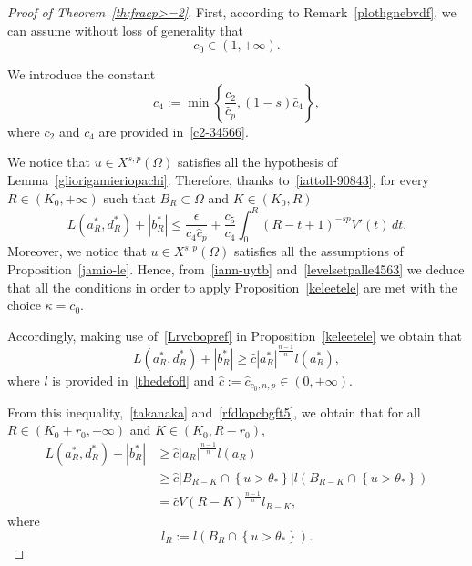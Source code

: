 \documentclass[12pt]{article}
\numberwithin{equation}{section}
\renewcommand{\leq}{\leqslant}
\renewcommand{\geq}{\geqslant}
\begin{document}
\begin{proof}[Proof of Theorem~\ref{th:fracp>=2}]
First, according to Remark~\ref{plothgnebvdf}, we can assume without loss of generality that 
\begin{equation*}
c_0\in (1,+\infty).
\end{equation*}

We introduce the constant
\begin{equation}\label{c5-0987ujgbt}
c_4:=\min \left\lbrace \frac{c_2}{\hat{c}_p}, (1-s)\bar{c}_4\right\rbrace,
\end{equation}
where $c_2$ and $\bar{c}_4$ are provided in~\eqref{c2-34566}. 

We notice that $u\in X^{s,p}(\Omega)$ satisfies all the hypothesis of Lemma~\ref{gliorigamieriopachi}. Therefore, thanks to~\eqref{iattoll-90843}, for every $R\in \left(K_0,+\infty\right)$ such that $B_R\subset\Omega$ and $K\in (K_0,R)$  
\begin{equation}\label{cdm:D}
L(a_R^*,d_R^*)+\left|b_R^*\right|\leq \frac{\epsilon}{c_4\hat{c}_p}+\frac{c_5}{c_4}\int_{0}^R(R-t+1)^{-sp}V'(t)\,dt.
\end{equation}
Moreover, we notice that $u\in X^{s,p}(\Omega)$ satisfies all the assumptions of Proposition~\ref{jamio-le}.  Hence, from~\eqref{iann-uytb} and~\eqref{levelsetpalle4563} we deduce that all the conditions in order to apply Proposition~\ref{keleetele} are met with the choice $\kappa=c_0$. 

Accordingly, making use of~\eqref{Lrvcbopref} in Proposition~\ref{keleetele} we obtain that 
\begin{equation*}
L(a_R^{*},d_R^{*})+\left|b_R^{*}\right| \geq \hat{c}\left|a_R^{*}\right|^{\frac{n-1}{n}} l(a_R^{*}),
\end{equation*}
where $l$ is provided in~\eqref{thedefofl} and $\hat{c}:=\hat{c}_{c_0,n,p}\in (0,+\infty)$. 

From this inequality,~\eqref{takanaka} and~\eqref{rfdlopcbgft5}, we obtain that for all~$R\in \left(K_0+r_0,+\infty\right)$ and $K\in (K_0,R-r_0)$,
\begin{equation}\label{side-p.l}
\begin{split}
L(a_R^{*},d_R^{*})+\left|b_R^{*}\right|& \geq \hat{c}\left|a_R\right|^{\frac{n-1}{n}} l(a_R)\\
&\geq \hat{c}\left|B_{R-K}\cap \left\lbrace u>\theta_*\right\rbrace\right|l\left(B_{R-K}\cap \left\lbrace u>\theta_*\right\rbrace\right)\\
&=\hat{c} V(R-K)^{\frac{n-1}{n}}l_{R-K},
\end{split}
\end{equation} 
where
\begin{equation*}
l_R:=l\left(B_R\cap \left\lbrace u>\theta_* \right\rbrace\right).
\end{equation*}


\end{proof}
\end{document}
